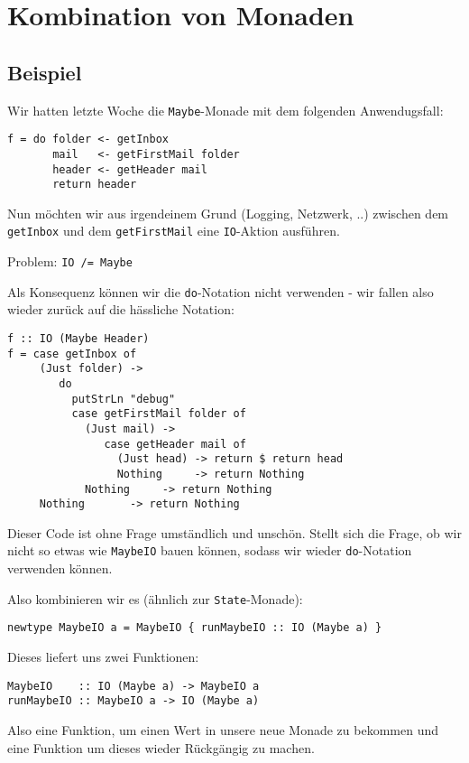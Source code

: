 \documentclass{beamer}
\begin{document}
\section{Kombination von Monaden}

\subsection{Beispiel}
\begin{frame}[fragile]
Wir hatten letzte Woche die \texttt{Maybe}-Monade mit dem folgenden Anwendugsfall: \bigskip

\begin{verbatim}
f = do folder <- getInbox
       mail   <- getFirstMail folder
       header <- getHeader mail
       return header
\end{verbatim}
\pause
Nun möchten wir aus irgendeinem Grund (Logging, Netzwerk, ..) zwischen dem \texttt{getInbox} und dem \texttt{getFirstMail} eine \texttt{IO}-Aktion ausführen.
\bigskip \pause

Problem: \texttt{IO /= Maybe}\bigskip

\pause
Als Konsequenz können wir die \texttt{do}-Notation nicht verwenden - wir fallen also wieder zurück auf die hässliche Notation:
\end{frame}

\begin{frame}[fragile]
\begin{verbatim}
f :: IO (Maybe Header)
f = case getInbox of
     (Just folder) -> 
        do
          putStrLn "debug"
          case getFirstMail folder of
            (Just mail) -> 
               case getHeader mail of
                 (Just head) -> return $ return head
                 Nothing     -> return Nothing
            Nothing     -> return Nothing
     Nothing       -> return Nothing
\end{verbatim}
\end{frame}

\begin{frame}[fragile]
Dieser Code ist ohne Frage umständlich und unschön. Stellt sich die Frage, ob wir nicht so etwas wie \texttt{MaybeIO} bauen können, sodass wir wieder \texttt{do}-Notation verwenden können.\bigskip

\pause
Also kombinieren wir es (ähnlich zur \texttt{State}-Monade):

\begin{verbatim}
newtype MaybeIO a = MaybeIO { runMaybeIO :: IO (Maybe a) }
\end{verbatim}

\pause
Dieses liefert uns zwei Funktionen:

\begin{verbatim}
MaybeIO    :: IO (Maybe a) -> MaybeIO a
runMaybeIO :: MaybeIO a -> IO (Maybe a)
\end{verbatim}

Also eine Funktion, um einen Wert in unsere neue Monade zu bekommen und eine Funktion um dieses wieder Rückgängig zu machen.
\end{frame}
\end{document}
